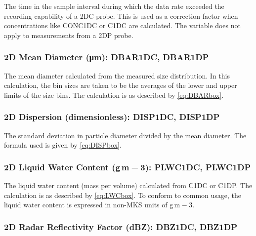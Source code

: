 \documentclass[
  english,
]{book}
\begin{document}
The time in the sample interval during which the data rate exceeded the recording capability of a 2DC probe. This is used as a correction factor when concentrations like CONC1DC or C1DC are calculated. The variable does not apply to measurements from a 2DP probe.

\hypertarget{dbar2d}{%
\subsubsection*{\texorpdfstring{2D Mean Diameter ({μ}m): DBAR1DC, DBAR1DP}{2D Mean Diameter (μm): DBAR1DC, DBAR1DP}}\label{dbar2d}}

The mean diameter calculated from the measured size distribution. In this calculation, the bin sizes are taken to be the averages of the lower and upper limits of the size bins. The calculation is as described by \eqref{eq:DBARbox}.

\hypertarget{disp2d}{%
\subsubsection*{2D Dispersion (dimensionless): DISP1DC, DISP1DP}\label{disp2d}}

The standard deviation in particle diameter divided by the mean diameter. The formula used is given by \eqref{eq:DISPbox}.

\hypertarget{lwc2d}{%
\subsubsection*{\texorpdfstring{2D Liquid Water Content (g m{ − 3}): PLWC1DC, PLWC1DP}{2D Liquid Water Content (g m − 3): PLWC1DC, PLWC1DP}}\label{lwc2d}}

The liquid water content (mass per volume) calculated from C1DC or C1DP. The calculation is as described by \eqref{eq:LWCbox}. To conform to common usage, the liquid water content is expressed in non-MKS units of g m{ − 3}.

\hypertarget{dbz2d}{%
\subsubsection*{2D Radar Reflectivity Factor (dBZ): DBZ1DC, DBZ1DP}\label{dbz2d}}
\end{document}

